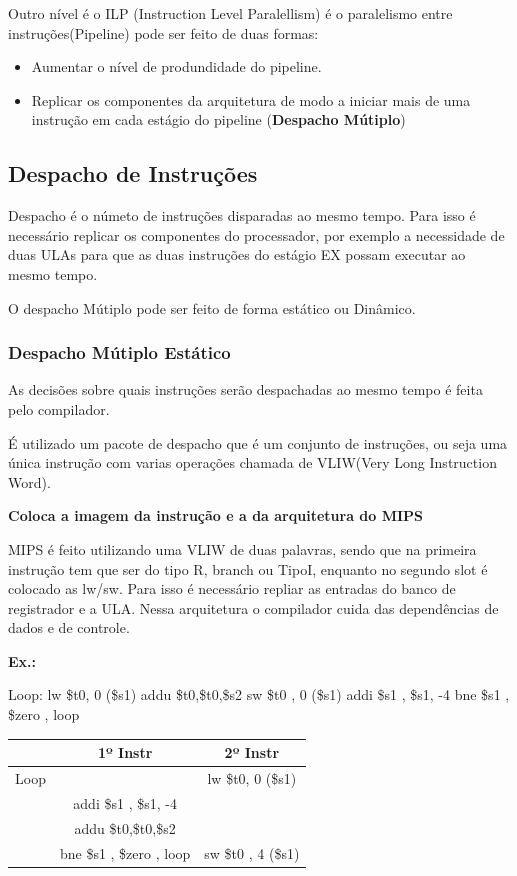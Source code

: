 \documentclass[a4paper]{article}
\begin{document}
Outro nível é o ILP (Instruction Level Paralellism) é o paralelismo entre instruções(Pipeline) pode ser feito de duas formas:
\begin{itemize}
    \item Aumentar o nível de produndidade do pipeline.
    \item Replicar os componentes da arquitetura de modo a iniciar mais de uma instrução em cada estágio do pipeline
        (\textbf{Despacho Mútiplo})
\end{itemize}

\subsection{Despacho de Instruções}
Despacho é o númeto de instruções disparadas ao mesmo tempo. Para isso é necessário replicar os componentes do
processador, por exemplo a necessidade de duas ULAs para que as duas instruções do estágio EX possam executar ao mesmo
tempo.

O despacho Mútiplo pode ser feito de forma estático ou Dinâmico.

\subsubsection{Despacho Mútiplo Estático}
    As decisões sobre quais instruções serão despachadas ao mesmo tempo é feita pelo compilador.

    É utilizado um pacote de despacho que é um conjunto de instruções, ou seja uma única instrução com varias operações
    chamada de VLIW(Very Long Instruction Word).

    \textbf{Coloca a imagem da instrução e a da arquitetura do MIPS}

    MIPS é feito utilizando uma VLIW de duas palavras, sendo que na primeira instrução tem que ser do tipo R, branch ou
    TipoI, enquanto no segundo slot é colocado as lw/sw. Para isso é necessário repliar as entradas do banco de
    registrador e a ULA. Nessa arquitetura o compilador cuida das dependências de dados e de controle.

    \textbf{Ex.:}

    Loop: lw \$t0, 0 (\$s1)
    addu \$t0,\$t0,\$s2
    sw \$t0 , 0 (\$s1)
    addi \$s1 , \$s1, -4
    bne \$s1 , \$zero , loop

\begin{table}[h]
    \begin{center}
        \begin{tabular}{||c|c|c||}
            \hline
            & \textbf{1º Instr} & \textbf{2º Instr}\\
            \hline
            Loop & & lw \$t0, 0 (\$s1)\\
                 & addi \$s1 , \$s1, -4 & \\
                 & addu \$t0,\$t0,\$s2 & \\
                 & bne \$s1 , \$zero , loop & sw \$t0 , 4 (\$s1)\\
            \hline

        \end{tabular}
    \end{center}
\end{table}
\end{document}
